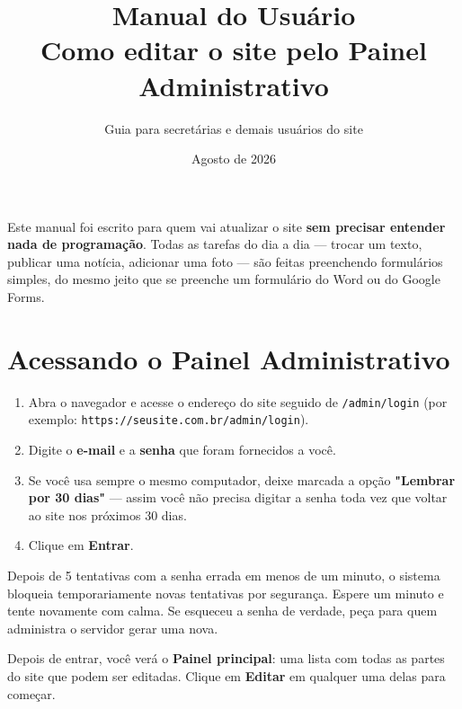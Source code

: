 \documentclass[11pt,a4paper]{article}
\title{
    \vspace{-2cm}
    {\Huge\bfseries\color{brandwine} Manual do Usuário}\\[0.3cm]
    {\Large Como editar o site pelo Painel Administrativo}
}
\author{Guia para secretárias e demais usuários do site}
\date{Agosto de 2026}
\begin{document}
\maketitle
\thispagestyle{empty}

\begin{center}
\begin{minipage}{0.85\textwidth}
\small
Este manual foi escrito para quem vai atualizar o site \textbf{sem precisar entender nada de
programação}. Todas as tarefas do dia a dia — trocar um texto, publicar uma notícia, adicionar
uma foto — são feitas preenchendo formulários simples, do mesmo jeito que se preenche um
formulário do Word ou do Google Forms.
\end{minipage}
\end{center}

\newpage
\tableofcontents
\newpage

\section{Acessando o Painel Administrativo}

\begin{enumerate}[leftmargin=2em]
    \item Abra o navegador e acesse o endereço do site seguido de \texttt{/admin/login}
          (por exemplo: \texttt{https://seusite.com.br/admin/login}).
    \item Digite o \textbf{e-mail} e a \textbf{senha} que foram fornecidos a você.
    \item Se você usa sempre o mesmo computador, deixe marcada a opção \textbf{"Lembrar por 30
          dias"} — assim você não precisa digitar a senha toda vez que voltar ao site nos
          próximos 30 dias.
    \item Clique em \textbf{Entrar}.
\end{enumerate}

\begin{aviso}
Depois de 5 tentativas com a senha errada em menos de um minuto, o sistema bloqueia
temporariamente novas tentativas por segurança. Espere um minuto e tente novamente com calma.
Se esqueceu a senha de verdade, peça para quem administra o servidor gerar uma nova.
\end{aviso}

Depois de entrar, você verá o \textbf{Painel principal}: uma lista com todas as partes do site
que podem ser editadas. Clique em \textbf{Editar} em qualquer uma delas para começar.
\end{document}
